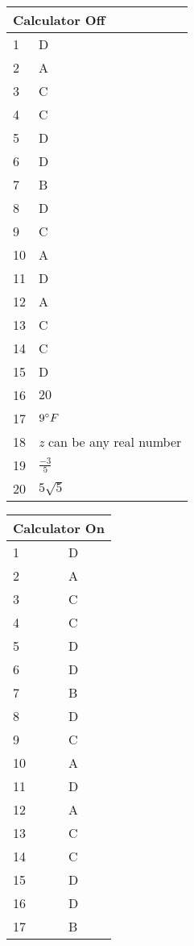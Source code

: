 \documentclass[10pt,twoside]{article}
\begin{document}
\begin{multicols}{2} 
\begin{center} 
\begin{tabularx}{0.6\columnwidth}{p{1cm}X} 
\multicolumn{2}{l}{Calculator Off} \\ 
\toprule 
1 & D \\ 
2 & A \\ 
3 & C \\ 
4 & C \\ 
5 & D \\ 
6 & D \\ 
7 & B \\ 
8 & D \\ 
9 & C \\ 
10 & A \\ 
11 & D \\ 
12 & A \\ 
13 & C \\ 
14 & C \\ 
15 & D \\ 
\midrule 
16 &   $20$ \\ 
17 &   $9\degree F$ \\ 
18 &   \textit{z} can be any real number \\ 
19 &   $\frac{-3}{5}$ \\ 
20 &    $5\sqrt{5}$ \\ 
\bottomrule 
\end{tabularx} 
\end{center} 
\vfill
\columnbreak
\begin{center} 
\begin{tabularx}{0.6\columnwidth}{p{1cm}X} 
\multicolumn{2}{l}{Calculator On} \\ 
\toprule 
1 & D \\ 
2 & A \\ 
3 & C \\ 
4 & C \\ 
5 & D \\ 
6 & D \\ 
7 & B \\ 
8 & D \\ 
9 & C \\ 
10 & A \\ 
11 & D \\ 
12 & A \\ 
13 & C \\ 
14 & C \\ 
15 & D \\ 
16 & D \\ 
17 & B \\ 

\end{tabularx}
\end{center}
\end{multicols}
\end{document}
